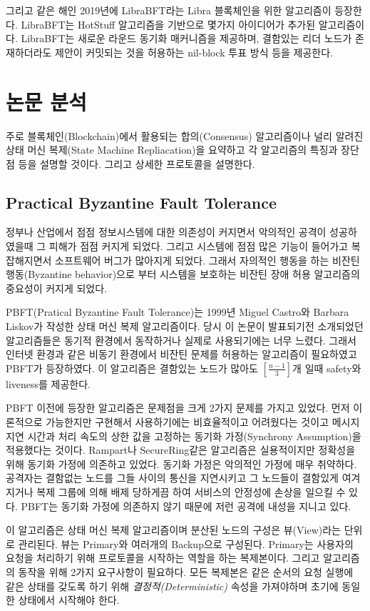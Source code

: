 \documentclass[table,smallextended]{svjour3}       %
\begin{document}
그리고 같은 해인 2019년에 LibraBFT라는 Libra 블록체인을 위한 알고리즘이 등장한다.
LibraBFT는 HotStuff 알고리즘을 기반으로 몇가지 아이디어가
추가된 알고리즘이다. LibraBFT는 새로운 라운드 동기화 매커니즘을 제공하며,
결함있는 리더 노드가 존재하더라도 제안이 커밋되는 것을 허용하는 nil-block
투표 방식 등을 제공한다.


\section{논문 분석}
\label{sec:1}
주로 블록체인(Blockchain)에서 활용되는 합의(Consensus) 알고리즘이나
널리 알려진 상태 머신 복제(State Machine Repliacation)을 요약하고
각 알고리즘의 특징과 장단점 등을 설명할 것이다. 그리고 상세한
프로토콜을 설명한다.

\subsection{Practical Byzantine Fault Tolerance}
정부나 산업에서 점점 정보시스템에 대한
의존성이 커지면서 악의적인 공격이 성공하였을때 그 피해가 점점 커지게 되었다.
그리고 시스템에 점점 많은 기능이 들어가고 복잡해지면서 소프트웨어 버그가 많아지게 되었다.
그래서 자의적인 행동을 하는 비잔틴 행동(Byzantine behavior)으로 부터 시스템을
보호하는 비잔틴 장애 허용 알고리즘의 중요성이 커지게 되었다.

PBFT(Pratical Byzantine Fault Tolerance)\cite{castro1999practical}는
1999년 Miguel Castro와 Barbara Liskov가 작성한 상태 머신 복제 알고리즘이다.
당시 이 논문이 발표되기전 소개되었던 알고리즘들은 동기적 환경에서 동작하거나
실제로 사용되기에는 너무 느렸다. 그래서 인터넷 환경과 같은 비동기 환경에서
비잔틴 문제를 허용하는 알고리즘이 필요하였고 PBFT가 등장하였다. 이 알고리즘은
결함있는 노드가 많아도 \([\frac{n-1}{3}]\)개 일때 safety와 liveness를 제공한다.

PBFT 이전에 등장한 알고리즘은 문제점을 크게 2가지 문제를 가지고 있었다. 
먼저 이론적으로 가능한지만 구현해서 사용하기에는 비효율적이고 어려웠다는 것이고
메시지 지연 시간과 처리 속도의 상한 값을 고정하는 동기화 가정(Synchrony Assumption)을 적용했다는 것이다.
Rampart나 SecureRing같은 알고리즘은 실용적이지만 정확성을 위해 동기화 가정에 의존하고 있었다.
동기화 가정은 악의적인 가정에 매우 취약하다. 공격자는 결함없는 노드를 그들 사이의 통신을 지연시키고
그 노드들이 결함있게 여겨지거나 복제 그룹에 의해 배제 당하게끔 하여 서비스의 안정성에 손상을 일으킬 수 있다.
PBFT는 동기화 가정에 의존하지 않기 때문에 저런 공격에 내성을 지니고 있다.

이 알고리즘은 상태 머신 복제 알고리즘이며 분산된 노드의 구성은 뷰(View)라는 단위로 관리된다.
뷰는 Primary와 여러개의 Backup으로 구성된다.
Primary는 사용자의 요청을 처리하기 위해 프로토콜을 시작하는 역할을 하는 복제본이다.
그리고 알고리즘의 동작을 위해 2가지 요구사항이 필요하다.
모든 복제본은 같은 순서의 요청 실행에 같은 상태를 갖도록 하기 위해
\textit{결정적(Deterministic)} 속성을 가져야하며 초기에 동일한 상태에서 시작해야 한다.
\end{document}
